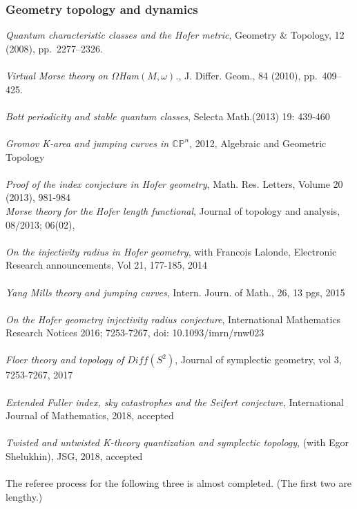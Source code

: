 \documentclass[overlapped,line,letterpaper]{res}
\begin{document}
\begin{resume}
\subsubsection {Geometry topology and dynamics}
{\em {Quantum characteristic classes
and the Hofer metric}}, Geometry \& Topology, 12 (2008), pp.~2277--2326.\\\\
{\em {Virtual Morse
  theory on $\Omega $Ham$(M, \omega)$.}}, J. Differ. Geom., 84 (2010),
  pp.~409--425.\\\\ 
{\em{Bott periodicity and stable
quantum classes}}, Selecta Math.(2013) 19: 439-460\\\\ 
 {\em{Gromov K-area and jumping
curves in $ \mathbb{CP} ^{n}$}}, 2012, Algebraic and Geometric Topology \\\\
 {\em {Proof
of the index conjecture in Hofer geometry}}, Math. Res. Letters, Volume 20
(2013), 981-984 \\
\emph{Morse theory for the Hofer length functional}, Journal of topology and
analysis, 08/2013; 06(02), \\\\
{\em {On the injectivity radius in Hofer geometry}}, with Francois Lalonde, 
Electronic Research announcements, Vol 21, 177-185, 2014 \\\\
\emph {Yang Mills theory and jumping curves}, Intern. Journ. of Math.,
26, 13 pgs,
2015 \\\\ 
\emph {On the Hofer geometry injectivity radius conjecture}, International Mathematics Research Notices 2016; 7253-7267, doi: 10.1093/imrn/rnw023 \\\\
\emph {Floer theory and topology of $Diff (S ^{2} )$},  Journal of symplectic
geometry, vol 3, 7253-7267, 2017 \\\\
\emph {Extended Fuller index, sky catastrophes and the Seifert conjecture}, International Journal of Mathematics, 2018, accepted  \\\\
\emph {Twisted and untwisted K-theory quantization and symplectic
topology}, (with Egor Shelukhin), JSG, 2018, accepted \\\\
The referee process for the following three is almost completed. (The first two are lengthy.)


\end{resume}
\end{document}
